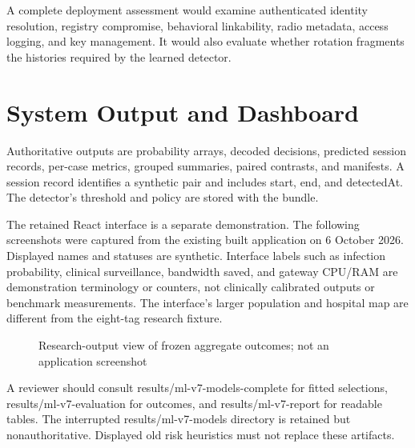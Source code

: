 \documentclass[12pt,a4paper]{report}
\begin{document}
A complete deployment assessment would examine authenticated identity resolution, registry compromise, behavioral linkability, radio metadata, access logging, and key management. It would also evaluate whether rotation fragments the histories required by the learned detector.

\section{System Output and Dashboard}
Authoritative outputs are probability arrays, decoded decisions, predicted session records, per-case metrics, grouped summaries, paired contrasts, and manifests. A session record identifies a synthetic pair and includes start, end, and detectedAt. The detector's threshold and policy are stored with the bundle.

The retained React interface is a separate demonstration. The following screenshots were captured from the existing built application on 6 October 2026. Displayed names and statuses are synthetic. Interface labels such as infection probability, clinical surveillance, bandwidth saved, and gateway CPU/RAM are demonstration terminology or counters, not clinically calibrated outputs or benchmark measurements. The interface's larger population and hospital map are different from the eight-tag research fixture.


\begin{figure}[htbp]
\centering
{}
\caption{Research-output view of frozen aggregate outcomes; not an application screenshot}\label{fig:output}
\end{figure}


A reviewer should consult results/ml-v7-models-complete for fitted selections, results/ml-v7-evaluation for outcomes, and results/ml-v7-report for readable tables. The interrupted results/ml-v7-models directory is retained but nonauthoritative. Displayed old risk heuristics must not replace these artifacts.
\end{document}
